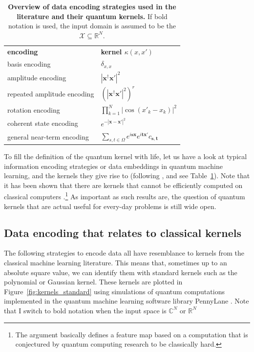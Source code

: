 \documentclass[aps, reprint, onecolumn, nofootinbib, longbibliography]{revtex4-2}
\begin{document}
\begin{table}[t]
    \centering
    \def\arraystretch{1.5}
    \begin{tabular}{l l}
        \hline \hline
        \textbf{encoding} & \textbf{kernel $\kappa(x, x')$}\\ 
         basis encoding & $ \delta_{x, x}$ \\
         amplitude encoding & $ |\mathbf{x}^{\dagger}\mathbf{x}'|^2$\\
         repeated amplitude encoding & $ (|\mathbf{x}^{\dagger}\mathbf{x}'|^2)^r$\\
         rotation encoding & $\prod_{k=1}^N |\cos (x'_k - x_k)|^2$\\
         coherent state encoding & $ e^{- |\mathbf{x} - \mathbf{x}'|^2 }$\\
         general near-term encoding & $   \sum_{s, t \in \Omega} e^{i \mathbf{s} \mathbf{x}}e^{i \mathbf{t}\mathbf{x}'} c_{\mathbf{s}, \mathbf{t}}$\\
        \hline \hline
    \end{tabular}
    \caption{\textbf{Overview of data encoding strategies used in the literature and their quantum kernels.} If bold notation is used, the input domain is assumed to be the $\mathcal{X} \subseteq \mathbb{R}^N$.}
    \label{tab:encoding_kernels}
\end{table}

To fill the definition of the quantum kernel with life, let us have a look at typical information encoding strategies or data embeddings in quantum machine learning, and the kernels they give rise to (following \cite{schuld2019quantum}, and see Table~\ref{tab:encoding_kernels}). Note that it has been shown that there are kernels that cannot be efficiently computed on classical computers \citep{liu2020rigorous}.\footnote{ The argument basically defines a feature map based on a computation that is conjectured by quantum computing research to be classically hard. } As important as such results are, the question of quantum kernels that are actual useful for every-day problems is still wide open.

\subsection{Data encoding that relates to classical kernels}

The following strategies to encode data all have resemblance to kernels from the classical machine learning literature. This means that, sometimes up to an absolute square value, we can identify them with standard kernels such as the polynomial or Gaussian kernel. These kernels are plotted in Figure~\ref{fig:kernels_standard} using simulations of quantum computations implemented in the quantum machine learning software library PennyLane \citep{bergholm2018pennylane}. Note that I switch to bold notation when the input space is $\mathbb{C}^N$ or $\mathbb{R}^N$ \\
\end{document}
